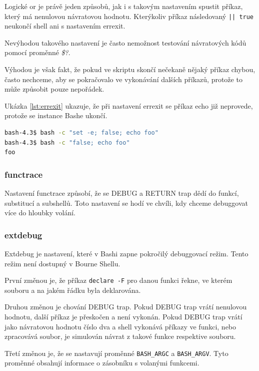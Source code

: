 \documentclass[thesis=M,czech]{FITthesis}[2012/06/26]
\begin{document}
Logické or je právě jeden způsobů, jak i s takovým nastavením spustit příkaz, který má nenulovou návratovou hodnotu. Kterýkoliv příkaz následovaný \texttt{|| true} neukončí shell ani s nastavením errexit.

Nevýhodou takového nastavení je často nemožnost testování návratových kódů pomocí proměnné \textit{\$?}.

Výhodou je však fakt, že pokud ve skriptu skončí nečekaně nějaký příkaz chybou, často nechceme, aby se pokračovalo ve vykonávání dalších příkazů, protože to může způsobit pouze nepořádek.

Ukázka \ref{lst:errexit} ukazuje, že při nastavení errexit se příkaz echo již neprovede, protože se instance Bashe ukončí.

\begin{lstlisting}[language=bash, caption={errexit}, label={lst:errexit}]
bash-4.3$ bash -c "set -e; false; echo foo"
bash-4.3$ bash -c "false; echo foo"
foo
\end{lstlisting}

%
%
%
\subsubsection{functrace}

Nastavení functrace způsobí, že se DEBUG a RETURN trap dědí do funkcí, substitucí a subshellů. Toto nastavení se hodí ve chvíli, kdy chceme debuggovat více do hloubky volání.

%
%
%
\subsubsection{extdebug}

Extdebug je nastavení, které v Bashi zapne pokročilý debuggovací režim. Tento režim není dostupný v Bourne Shellu.

První změnou je, že příkaz \texttt{declare -F} pro danou funkci řekne, ve kterém souboru a na jakém řádku byla deklarována.

Druhou změnou je chování DEBUG trap. Pokud DEBUG trap vrátí nenulovou hodnotu, další příkaz je přeskočen a není vykonán. Pokud DEBUG trap vrátí jako návratovou hodnotu číslo dva a shell vykonává příkazy ve funkci, nebo zpracovává soubor, je simulován návrat z takové funkce respektive souboru.

Třetí změnou je, že se nastavují proměnné \texttt{BASH\_ARGC} a \texttt{BASH\_ARGV}. Tyto proměnné obsahují informace o zásobníku s volanými funkcemi.
\end{document}
